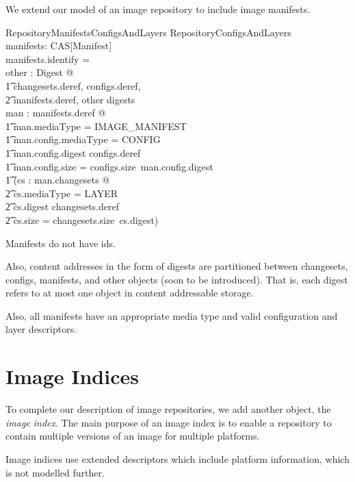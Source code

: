 \documentclass[a4paper,twoside,12pt]{article}
\begin{document}
We extend our model of an image repository to include image manifests.
\begin{schema}{RepositoryManifestsConfigsAndLayers}
  RepositoryConfigsAndLayers \\
  manifests: CAS[Manifest] \\
\where
  manifests.identify = \emptyset \\
\also
  \exists other : \power Digest @ \\
  \t1 \langle \dom changesets.deref, \dom configs.deref, \\
  \t2 \dom manifests.deref, other  \rangle \partition digests \\
\also
  \forall man : \ran manifests.deref @ \\
   \t1 man.mediaType = IMAGE\_MANIFEST \land \\
   \t1 man.config.mediaType = CONFIG \land \\
   \t1 man.config.digest \in \dom configs.deref \land \\
   \t1 man.config.size = configs.size~man.config.digest \land \\
   \t1 (\forall cs : \ran man.changesets @ \\
     \t2 cs.mediaType = LAYER \land \\
     \t2 cs.digest \in \dom changesets.deref \land \\
     \t2 cs.size = changesets.size~cs.digest) \\
\end{schema}
Manifests do not have ids.

Also, content addresses in the form of digests are partitioned between changesets, configs, manifests, and other objects (soon to be introduced).
That is, each digest refers to at most one object in content addressable storage.

Also, all manifests have an appropriate media type and valid configuration and layer descriptors.

\newpage
\section{Image Indices}

To complete our description of image repositories, we add another object, the \textit{image index}. The main purpose of an image index is to
enable a repository to contain multiple versions of an image for multiple platforms.

Image indices use extended descriptors which include platform information, which is not modelled further.
\begin{zed}
[ Platform ] 
\end{zed}
\end{document}
